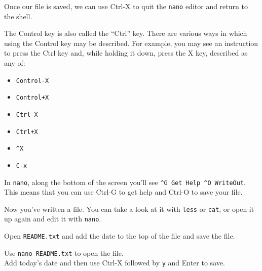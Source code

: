 \documentclass[
  letterpaper,
  DIV=11,
  numbers=noendperiod]{scrreprt}
\providecommand{\tightlist}{%
  \setlength{\itemsep}{0pt}\setlength{\parskip}{0pt}}\usepackage{longtable,booktabs,array}
\begin{document}
Once our file is saved, we can use Ctrl-X to quit the \texttt{nano}
editor and return to the shell.

The Control key is also called the ``Ctrl'' key. There are various ways
in which using the Control key may be described. For example, you may
see an instruction to press the Ctrl key and, while holding it down,
press the X key, described as any of:

\begin{itemize}
\tightlist
\item
  \texttt{Control-X}
\item
  \texttt{Control+X}
\item
  \texttt{Ctrl-X}
\item
  \texttt{Ctrl+X}
\item
  \texttt{\^{}X}
\item
  \texttt{C-x}
\end{itemize}

In \texttt{nano}, along the bottom of the screen you'll see
\texttt{\^{}G\ Get\ Help\ \^{}O\ WriteOut}. This means that you can use
Ctrl-G to get help and Ctrl-O to save your file.

Now you've written a file. You can take a look at it with \texttt{less}
or \texttt{cat}, or open it up again and edit it with \texttt{nano}.

\begin{tcolorbox}[enhanced jigsaw, opacitybacktitle=0.6, colback=white, coltitle=black, opacityback=0, rightrule=.15mm, toptitle=1mm, toprule=.15mm, bottomtitle=1mm, colframe=quarto-callout-caution-color-frame, arc=.35mm, titlerule=0mm, colbacktitle=quarto-callout-caution-color!10!white, leftrule=.75mm, title=\textcolor{quarto-callout-caution-color}{\faFire}\hspace{0.5em}{Exercise}, breakable, bottomrule=.15mm, left=2mm]

Open \texttt{README.txt} and add the date to the top of the file and
save the file.

\end{tcolorbox}

\begin{tcolorbox}[enhanced jigsaw, opacitybacktitle=0.6, colback=white, coltitle=black, opacityback=0, rightrule=.15mm, toptitle=1mm, toprule=.15mm, bottomtitle=1mm, colframe=quarto-callout-note-color-frame, arc=.35mm, titlerule=0mm, colbacktitle=quarto-callout-note-color!10!white, leftrule=.75mm, title=\textcolor{quarto-callout-note-color}{\faInfo}\hspace{0.5em}{Solution}, breakable, bottomrule=.15mm, left=2mm]

Use \texttt{nano\ README.txt} to open the file.\\
Add today's date and then use Ctrl-X followed by \texttt{y} and Enter to
save.

\end{tcolorbox}
\end{document}
